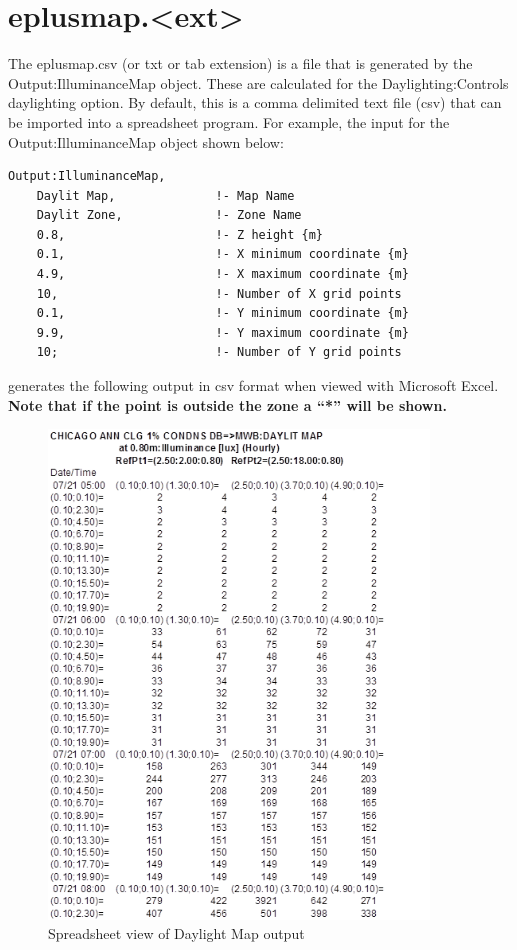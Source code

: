 \section{eplusmap.\textless{}ext\textgreater{}}\label{eplusmap.ext}

The eplusmap.csv (or txt or tab extension) is a file that is generated by the Output:IlluminanceMap object. These are calculated for the Daylighting:Controls daylighting option. By default, this is a comma delimited text file (csv) that can be imported into a spreadsheet program. For example, the input for the Output:IlluminanceMap object shown below:

\begin{lstlisting}
Output:IlluminanceMap,
    Daylit Map,              !- Map Name
    Daylit Zone,             !- Zone Name
    0.8,                     !- Z height {m}
    0.1,                     !- X minimum coordinate {m}
    4.9,                     !- X maximum coordinate {m}
    10,                      !- Number of X grid points
    0.1,                     !- Y minimum coordinate {m}
    9.9,                     !- Y maximum coordinate {m}
    10;                      !- Number of Y grid points
\end{lstlisting}

generates the following output in csv format when viewed with Microsoft Excel.~ \textbf{Note that if the point is outside the zone a ``*'' will be shown.}

\begin{figure}[hbtp] %
\centering
\includegraphics[width=0.9\textwidth, height=0.9\textheight, keepaspectratio=true]{media/image019.png}
\caption{Spreadsheet view of Daylight Map output \protect \label{fig:spreadsheet-view-of-daylight-map-output}}
\end{figure}

